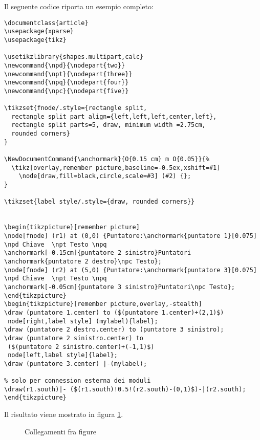 Il seguente codice riporta un esempio completo:
\begin{lstlisting}[frame=lines]
\documentclass{article}
\usepackage{xparse}
\usepackage{tikz}

\usetikzlibrary{shapes.multipart,calc}
\newcommand{\npd}{\nodepart{two}}
\newcommand{\npt}{\nodepart{three}}
\newcommand{\npq}{\nodepart{four}}
\newcommand{\npc}{\nodepart{five}}

\tikzset{fnode/.style={rectangle split, 
  rectangle split part align={left,left,left,center,left}, 
  rectangle split parts=5, draw, minimum width =2.75cm,
  rounded corners}
}

\NewDocumentCommand{\anchormark}{O{0.15 cm} m O{0.05}}{%
  \tikz[overlay,remember picture,baseline=-0.5ex,xshift=#1] 
    \node[draw,fill=black,circle,scale=#3] (#2) {};
}

\tikzset{label style/.style={draw, rounded corners}}


\begin{tikzpicture}[remember picture]
\node[fnode] (r1) at (0,0) {Puntatore:\anchormark{puntatore 1}[0.075]  
\npd Chiave  \npt Testo \npq 
\anchormark[-0.15cm]{puntatore 2 sinistro}Puntatori 
\anchormark{puntatore 2 destro}\npc Testo};  
\node[fnode] (r2) at (5,0) {Puntatore:\anchormark{puntatore 3}[0.075]  
\npd Chiave  \npt Testo \npq 
\anchormark[-0.05cm]{puntatore 3 sinistro}Puntatori\npc Testo};  
\end{tikzpicture}
\begin{tikzpicture}[remember picture,overlay,-stealth] 
\draw (puntatore 1.center) to ($(puntatore 1.center)+(2,1)$) 
 node[right,label style] (mylabel){label};
\draw (puntatore 2 destro.center) to (puntatore 3 sinistro);
\draw (puntatore 2 sinistro.center) to 
 ($(puntatore 2 sinistro.center)+(-1,1)$)
 node[left,label style]{label};
\draw (puntatore 3.center) |-(mylabel);

% solo per connession esterna dei moduli
\draw(r1.south)|- ($(r1.south)!0.5!(r2.south)-(0,1)$)-|(r2.south);
\end{tikzpicture}

\end{lstlisting}

Il risultato viene mostrato in figura \ref{fig:collegamentifigure}.

\begin{figure}[ht]
\centering
{}
\caption{Collegamenti fra figure}
\label{fig:collegamentifigure}
\end{figure}

